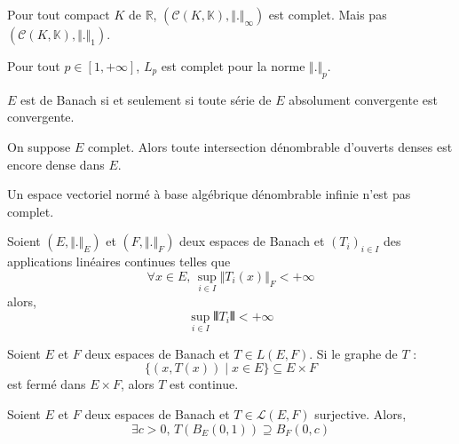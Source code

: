 
  \begin{example}
    Pour tout compact $K$ de $\mathbb{R}$, $(\mathcal{C}(K, \mathbb{K}), \Vert . \Vert_\infty)$ est complet. Mais pas $(\mathcal{C}(K, \mathbb{K}), \Vert . \Vert_1)$.
  \end{example}

  \begin{theorem}
    Pour tout $p \in [1, +\infty]$, $L_p$ est complet pour la norme $\Vert . \Vert_p$.
  \end{theorem}


  \begin{proposition}
    $E$ est de Banach si et seulement si toute série de $E$ absolument convergente est convergente.
  \end{proposition}


  \begin{theorem}
    On suppose $E$ complet. Alors toute intersection dénombrable d'ouverts denses est encore dense dans $E$.
  \end{theorem}


  \begin{application}
    Un espace vectoriel normé à base algébrique dénombrable infinie n'est pas complet.
  \end{application}


  \begin{application}
    Soient $(E, \Vert . \Vert_E)$ et $(F, \Vert . \Vert_F)$ deux espaces de Banach et $(T_i)_{i \in I}$ des applications linéaires continues telles que
    \[ \forall x \in E, \, \sup_{i \in I} \Vert T_i(x) \Vert_F < +\infty \]
    alors,
    \[ \sup_{i \in I} \VERT T_i \VERT < +\infty \]
  \end{application}

  \begin{application}
    Soient $E$ et $F$ deux espaces de Banach et $T \in L(E,F)$. Si le graphe de $T$ :
    \[ \{ (x, T(x)) \mid x \in E \} \subseteq E \times F \]
    est fermé dans $E \times F$, alors $T$ est continue.
  \end{application}

    \begin{application}
    Soient $E$ et $F$ deux espaces de Banach et $T \in \mathcal{L}(E,F)$ surjective. Alors,
    \[ \exists c > 0, \, T\left(B_E(0,1)\right) \supseteq B_F(0,c) \]
  \end{application}

